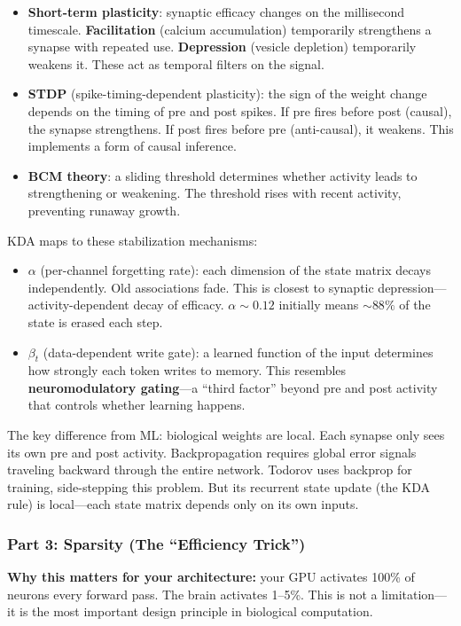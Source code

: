 \documentclass[11pt,a4paper]{article}
\begin{document}
\begin{itemize}
  \item \textbf{Short-term plasticity}: synaptic efficacy changes on the millisecond timescale. \textbf{Facilitation} (calcium accumulation) temporarily strengthens a synapse with repeated use. \textbf{Depression} (vesicle depletion) temporarily weakens it. These act as temporal filters on the signal.
  \item \textbf{STDP} (spike-timing-dependent plasticity): the sign of the weight change depends on the timing of pre and post spikes. If pre fires before post (causal), the synapse strengthens. If post fires before pre (anti-causal), it weakens. This implements a form of causal inference.
  \item \textbf{BCM theory}: a sliding threshold determines whether activity leads to strengthening or weakening. The threshold rises with recent activity, preventing runaway growth.
\end{itemize}

KDA maps to these stabilization mechanisms:
\begin{itemize}
  \item $\alpha$ (per-channel forgetting rate): each dimension of the state matrix decays independently. Old associations fade. This is closest to synaptic depression---activity-dependent decay of efficacy. $\alpha \sim 0.12$ initially means ${\sim}88\%$ of the state is erased each step.
  \item $\beta_t$ (data-dependent write gate): a learned function of the input determines how strongly each token writes to memory. This resembles \textbf{neuromodulatory gating}---a ``third factor'' beyond pre and post activity that controls whether learning happens.
\end{itemize}

The key difference from ML: biological weights are local. Each synapse only sees its own pre and post activity. Backpropagation requires global error signals traveling backward through the entire network. Todorov uses backprop for training, side-stepping this problem. But its recurrent state update (the KDA rule) is local---each state matrix depends only on its own inputs.

\subsubsection{Part 3: Sparsity (The ``Efficiency Trick'')}

\textbf{Why this matters for your architecture:} your GPU activates 100\% of neurons every forward pass. The brain activates 1--5\%. This is not a limitation---it is the most important design principle in biological computation.
\end{document}
